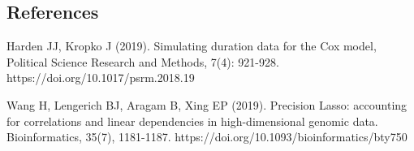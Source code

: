 \documentclass[12]{article}
\begin{document}
\subsection*{References}

Harden JJ, Kropko J (2019). Simulating duration data for the Cox model, Political Science Research and Methods, 7(4): 921-928. https://doi.org/10.1017/psrm.2018.19

Wang H, Lengerich BJ, Aragam B, Xing EP (2019). Precision Lasso: accounting for correlations and linear dependencies in high-dimensional genomic data. Bioinformatics, 35(7), 1181-1187. https://doi.org/10.1093/bioinformatics/bty750
\end{document}

